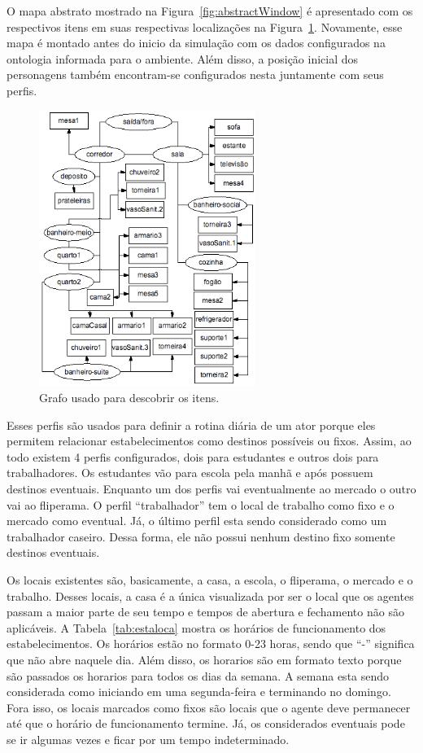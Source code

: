 O mapa abstrato mostrado na Figura~\ref{fig:abstractWindow} é apresentado
com os respectivos itens em suas respectivas localizações na
Figura~\ref{fig:abstractAnother}. Novamente, esse mapa é montado antes do
inicio da simulação com os dados configurados na ontologia informada para o
ambiente. Além disso, a posição inicial dos personagens também encontram-se
configurados nesta juntamente com seus perfis.

\begin{figure}
	\begin{center}
		\includegraphics[width=7cm]{figuras/abstract-comitens.png}
	\end{center}
	\caption{Grafo usado para descobrir os itens.}
	\label{fig:abstractAnother}
\end{figure}

Esses perfis são usados para definir a rotina diária de um ator porque eles
permitem relacionar estabelecimentos como destinos possíveis ou fixos.
Assim, ao todo existem 4 perfis configurados, dois para estudantes e
outros dois para trabalhadores. Os estudantes vão para escola pela manhã e
após possuem destinos eventuais. Enquanto um dos perfis vai eventualmente ao
mercado o outro vai ao fliperama. O perfil ``trabalhador'' tem o local de
trabalho como fixo e o mercado como eventual. Já, o último perfil esta sendo
considerado como um trabalhador caseiro. Dessa forma, ele não possui nenhum
destino fixo somente destinos eventuais.

Os locais existentes são, basicamente, a casa, a escola, o fliperama, o
mercado e o trabalho. Desses locais, a casa é a única visualizada por ser o
local que os agentes passam a maior parte de seu tempo e tempos de abertura e
fechamento não são aplicáveis. A Tabela~\ref{tab:estaloca} mostra os horários
de funcionamento dos estabelecimentos. Os horários estão no formato 0-23
horas, sendo que ``-'' significa que não abre naquele dia. Além disso, os
horarios são em formato texto porque são passados os horarios para todos os
dias da semana. A semana esta sendo considerada como iniciando em uma
segunda-feira e terminando no domingo. Fora isso, os locais marcados como
fixos são locais que o agente deve permanecer até que o horário de
funcionamento termine. Já, os considerados eventuais pode se ir algumas vezes
e ficar por um tempo indeterminado.


